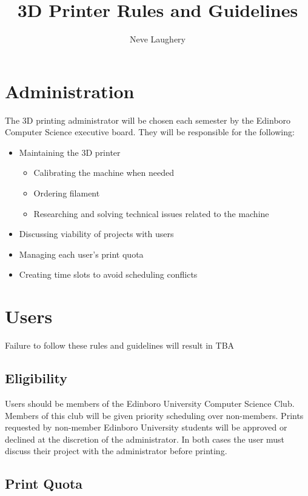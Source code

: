 \documentclass{article}
\title{3D Printer Rules and Guidelines}
\author{Neve Laughery}
\begin{document}
\maketitle

\section{Administration}

The 3D printing administrator will be chosen each semester by the Edinboro 
Computer Science executive board. They will be responsible for the following:

\begin{itemize}
	\item Maintaining the 3D printer
	\begin{itemize}
		\item Calibrating the machine when needed
		\item Ordering filament
		\item Researching and solving technical issues related to the machine
	\end{itemize}
	\item Discussing viability of projects with users
	\item Managing each user's print quota
	\item Creating time slots to avoid scheduling conflicts
\end{itemize}

\section{Users}

Failure to follow these rules and guidelines will result in TBA

\subsection{Eligibility}

Users should be members of the Edinboro University Computer Science Club.
Members of this club will be given priority scheduling over non-members. Prints
requested by non-member Edinboro University students will be approved or
declined at the discretion of the administrator. In both cases the user must 
discuss their project with the administrator before printing.

\subsection{Print Quota}
\end{document}
